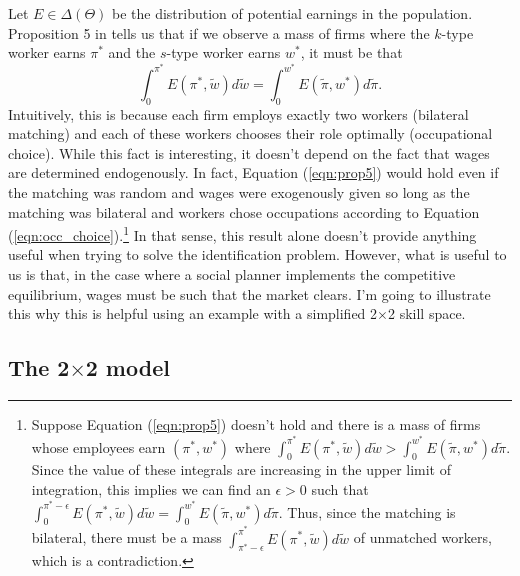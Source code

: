 \documentclass[12 pt]{article}
\begin{document}
Let $E \in \Delta(\Theta)$ be the distribution of potential earnings in the population. Proposition 5 in \citet{mak2025occupational} tells us that if we observe a mass of firms where the $k$-type worker earns $\pi^*$ and the $s$-type worker earns $w^*$, it must be that
\begin{equation}
	\int_0^{\pi^*} E(\pi^*,\tilde{w}) d\tilde{w} = \int_0^{w^*} E(\tilde{\pi},w^*) d \tilde{\pi}.
	\label{eqn:prop5}
\end{equation}
Intuitively, this is because each firm employs exactly two workers (bilateral matching) and each of these workers chooses their role optimally (occupational choice). While this fact is interesting, it doesn't depend on the fact that wages are determined endogenously. In fact, Equation (\ref{eqn:prop5}) would hold even if the matching was random and wages were exogenously given so long as the matching was bilateral and workers chose occupations according to Equation (\ref{eqn:occ_choice}).\footnote{Suppose Equation (\ref{eqn:prop5}) doesn't hold and there is a mass of firms whose employees earn $(\pi^*,w^*)$ where $\int_0^{\pi^*} E(\pi^*,\tilde{w}) d\tilde{w} > \int_0^{w^*} E(\tilde{\pi},w^*) d \tilde{\pi}$. Since the value of these integrals are increasing in the upper limit of integration, this implies we can find an $\epsilon > 0$ such that $\int_0^{\pi^*-\epsilon} E(\pi^*,\tilde{w}) d\tilde{w} = \int_0^{w^*} E(\tilde{\pi},w^*) d \tilde{\pi}$. Thus, since the matching is bilateral, there must be a mass $\int_{\pi^*-\epsilon}^{\pi^*} E(\pi^*,\tilde{w}) d\tilde{w}$ of unmatched workers, which is a contradiction. } In that sense, this result alone doesn't provide anything useful when trying to solve the identification problem. However, what is useful to us is that, in the case where a social planner implements the competitive equilibrium, wages must be such that the market clears. I'm going to illustrate this why this is helpful using an example with a simplified 2$\times$2 skill space.

\subsection{The 2$\times$2 model}
\end{document}
